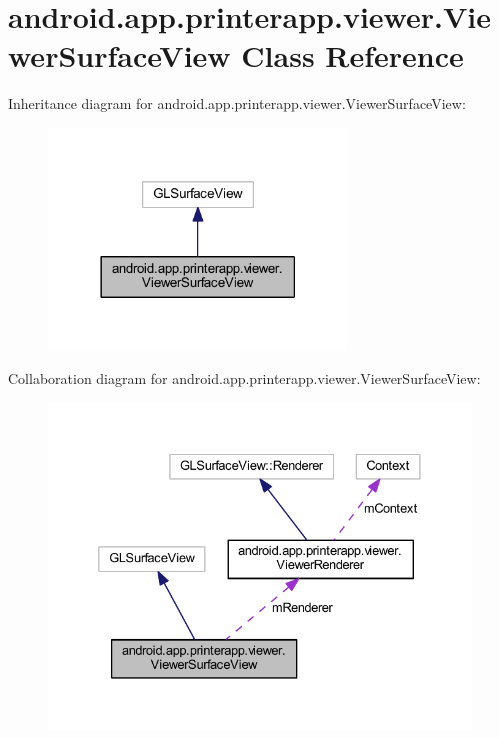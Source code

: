 \hypertarget{classandroid_1_1app_1_1printerapp_1_1viewer_1_1_viewer_surface_view}{}\section{android.\+app.\+printerapp.\+viewer.\+Viewer\+Surface\+View Class Reference}
\label{classandroid_1_1app_1_1printerapp_1_1viewer_1_1_viewer_surface_view}


Inheritance diagram for android.\+app.\+printerapp.\+viewer.\+Viewer\+Surface\+View\+:
\nopagebreak
\begin{figure}[H]
\begin{center}
\leavevmode
\includegraphics[width=225pt]{classandroid_1_1app_1_1printerapp_1_1viewer_1_1_viewer_surface_view__inherit__graph}
\end{center}
\end{figure}


Collaboration diagram for android.\+app.\+printerapp.\+viewer.\+Viewer\+Surface\+View\+:
\nopagebreak
\begin{figure}[H]
\begin{center}
\leavevmode
\includegraphics[width=332pt]{classandroid_1_1app_1_1printerapp_1_1viewer_1_1_viewer_surface_view__coll__graph}
\end{center}
\end{figure}

